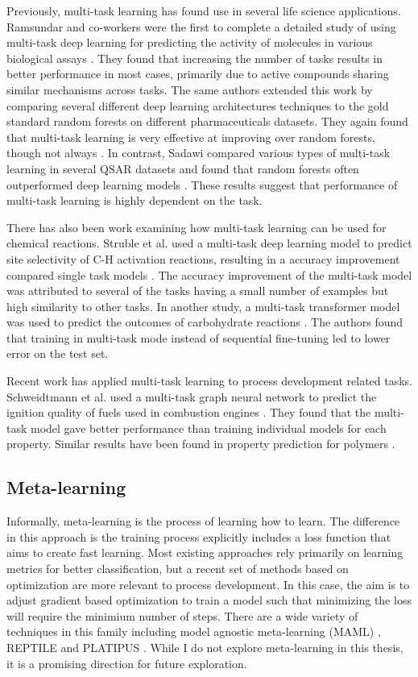 Previously, multi-task learning has found use in several life science applications. Ramsundar and co-workers were the first to complete a detailed study of using multi-task deep learning for predicting the activity of molecules in various biological assays \cite{Ramsundar2015}. They found that increasing the number of tasks results in better performance in most cases, primarily due to active compounds sharing similar mechanisms across tasks. The same authors extended this work by comparing several different deep learning architectures techniques to the gold standard random forests on different pharmaceuticals datasets. They again found that multi-task learning is very effective at improving over random forests, though not always \cite{Ramsundar2017}. In contrast, Sadawi compared various types of multi-task learning in several QSAR datasets and found that random forests often outperformed deep learning models \cite{Sadawi2019}. These results suggest that performance of multi-task learning is highly dependent on the task.

There has also been work examining how multi-task learning can be used for chemical reactions. Struble et al. used a multi-task deep learning model to predict site selectivity of C-H activation reactions, resulting in a accuracy improvement compared single task models \cite{Struble2020}. The accuracy improvement of the multi-task model was attributed to several of the tasks having a small number of examples but high similarity to other tasks. In another study, a multi-task transformer model was used to predict the outcomes of carbohydrate reactions \cite{Pesciullesi2020}. The authors found that training in multi-task mode instead of sequential fine-tuning led to lower error on the test set. 

Recent work has applied multi-task learning to process development related tasks. Schweidtmann et al. used a multi-task graph neural network to predict the ignition quality of fuels used in combustion engines \cite{Schweidtmann2020}. They found that the multi-task model gave better performance than training individual models for each property. Similar results have been found in property prediction for polymers \cite{Gurnani2023}.

\subsection{Meta-learning}

Informally, meta-learning is the process of learning how to learn. The difference in this approach is the training process explicitly includes a loss function that aims to create fast learning. Most existing approaches rely primarily on learning metrics for better classification, but a recent set of methods based on optimization are more relevant to process development. 
In this case, the aim is to adjust gradient based optimization to train a model such that minimizing the loss will require the minimium number of steps. There are a wide variety of techniques in this family including model agnostic meta-learning (MAML) \cite{Finn2017}, REPTILE \cite{Nichols2018} and PLATIPUS \cite{Finn2018}. While I do not explore meta-learning in this thesis, it is a promising direction for future exploration.

